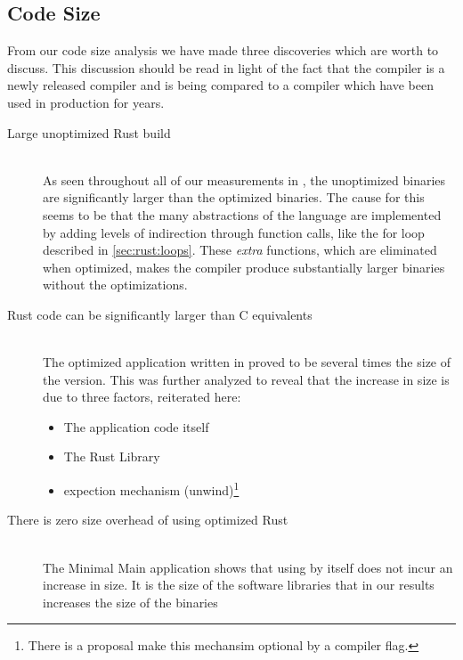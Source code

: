 \subsection{Code Size}

From our code size analysis we have made three discoveries which are worth to discuss.
This discussion should be read in light of the fact that the {\rust} compiler is a newly released compiler and is being compared to a {\C} compiler which have been used in production for years.

\begin{description}

\item [Large unoptimized Rust build] \hfill \\
  As seen throughout all of our measurements in {\rust}, the unoptimized binaries are significantly larger than the optimized binaries.
  The cause for this seems to be that the many abstractions of the {\rust} language are implemented by adding levels of indirection through function calls, like the for loop described in \autoref{sec:rust:loops}.
  These \emph{extra} functions, which are eliminated when optimized, makes the compiler produce substantially larger binaries without the optimizations.

\item [Rust code can be significantly larger than C equivalents] \hfill \\
  The optimized {\tracker} application written in {\rust} proved to be several times the size of the {\C} version.
  This was further analyzed to reveal that the increase in size is due to three factors, reiterated here:
\begin{itemize}
\item The application code itself
\item The Rust Library
\item {\rust} expection mechanism (unwind)\footnote{There is a proposal make this mechansim optional by a compiler flag.}
\end{itemize}

\item [There is zero size overhead of using optimized Rust] \hfill \\
  The Minimal Main application shows that using {\rust} by itself does not incur an increase in size.
  It is the size of the software libraries that in our results increases the size of the {\rust} binaries

\end{description}

